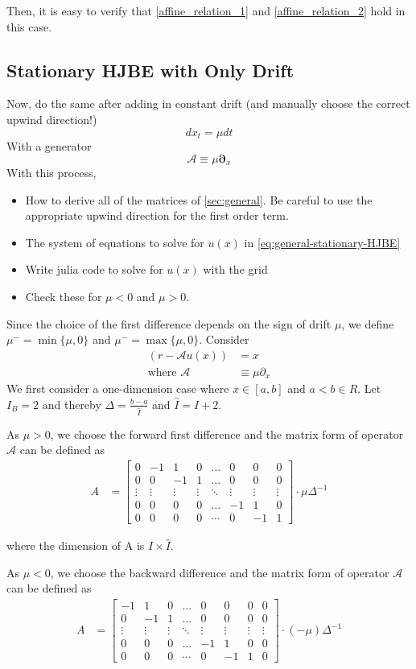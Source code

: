 \documentclass[11pt]{article}
\newcommand{\D}[1][]{\ensuremath{\boldsymbol{\partial}_{#1}}}
\newcommand{\A}{\ensuremath{\mathcal{A}}}
\begin{document}
Then, it is easy to verify that \eqref{affine_relation_1} and \eqref{affine_relation_2} hold in this case.

\subsection{Stationary HJBE with Only Drift}
Now, do the same after adding in constant drift (and manually choose the correct upwind direction!)
$$
d x_t = \mu dt
$$
With a generator
$$
	\A \equiv \mu \D[x]
$$
With this process,
\begin{itemize}
	\item How to derive all of the matrices of \cref{sec:general}.  Be careful to use the appropriate upwind direction for the first order term.
	\item The system of equations to solve for $u(x)$ in \cref{eq:general-stationary-HJBE}
	\item Write julia code to solve for $u(x)$ with the grid
	\item Check these for $\mu < 0$ and $\mu > 0$.
\end{itemize}
Since the choice of the first difference depends on the sign of drift $\mu$, we define $\mu^- =\min\{\mu, 0\}$ and $\mu^- =\max\{\mu, 0\}$.
Consider
\begin{align}
(r- \A u(x)) &= x\label{HJBE_PDE_with_drifts}\\
\text{where }\A&\equiv \mu\partial_{x}
\end{align}
We first consider a one-dimension case where $x\in [a, b]$ and $a<b\in R$. Let $I_B = 2$ and thereby $\Delta  = \frac{b-a}{\hat{I}}$ and $\hat{I} = I+2$. 

As $\mu>0$, we choose the forward first difference and the matrix form of operator $\A$ can be defined as
\begin{align}
A &= \begin{bmatrix}
0&-1&1&0&\dots&0&0&0\\
0&0&-1&1&\dots&0&0&0\\
\vdots&\vdots&\vdots&\vdots&\ddots&\vdots&\vdots&\vdots\\
0&0&0&0&\dots&-1&1&0\\
0&0&0&0&\cdots&0&-1&1
\end{bmatrix}\cdot\mu\Delta^{-1}\nonumber
\end{align}

where the dimension of A is $I\times\hat{I}$.

As $\mu<0$, we choose the backward difference and the matrix form of operator $\A$ can be defined as
\begin{align}
A &= \begin{bmatrix}
-1&1&0&\dots&0&0&0&0\\
0&-1&1&\dots&0&0&0&0\\
\vdots&\vdots&\vdots&\ddots&\vdots&\vdots&\vdots&\vdots\\
0&0&0&\dots&-1&1&0&0\\
0&0&0&\cdots&0&-1&1&0
\end{bmatrix}\cdot (-\mu)\Delta^{-1}\nonumber
\end{align}
\end{document}
